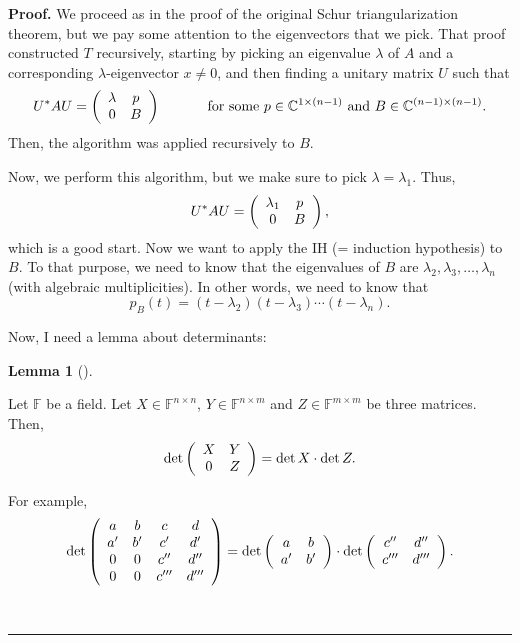 \documentclass[numbers=enddot,12pt,final,onecolumn,notitlepage]{scrartcl}%
\numberwithin{exer}{subsection}
\theoremstyle{definition}
\newtheorem{lem}[theo]{Lemma}
\newenvironment{lemma}[1][]
{\begin{lem}[#1]\begin{leftbar}}
{\end{leftbar}\end{lem}}
\newenvironment{proof}[1][Proof]{\noindent\textbf{#1.} }{\ \rule{0.5em}{0.5em}}
\begin{document}
\begin{proof}
We proceed as in the proof of the original Schur triangularization theorem,
but we pay some attention to the eigenvectors that we pick. That proof
constructed $T$ recursively, starting by picking an eigenvalue $\lambda$ of
$A$ and a corresponding $\lambda$-eigenvector $x\neq0$, and then finding a
unitary matrix $U$ such that%
\[
U^{\ast}AU=\left(
\begin{array}
[c]{cc}%
\lambda & p\\
0 & B
\end{array}
\right)  \ \ \ \ \ \ \ \ \ \ \text{for some }p\in\mathbb{C}^{1\times\left(
n-1\right)  }\text{ and }B\in\mathbb{C}^{\left(  n-1\right)  \times\left(
n-1\right)  }.
\]
Then, the algorithm was applied recursively to $B$.

Now, we perform this algorithm, but we make sure to pick $\lambda=\lambda_{1}%
$. Thus,%
\[
U^{\ast}AU=\left(
\begin{array}
[c]{cc}%
\lambda_{1} & p\\
0 & B
\end{array}
\right)  ,
\]
which is a good start. Now we want to apply the IH (= induction hypothesis) to
$B$. To that purpose, we need to know that the eigenvalues of $B$ are
$\lambda_{2},\lambda_{3},\ldots,\lambda_{n}$ (with algebraic multiplicities).
In other words, we need to know that%
\[
p_{B}\left(  t\right)  =\left(  t-\lambda_{2}\right)  \left(  t-\lambda
_{3}\right)  \cdots\left(  t-\lambda_{n}\right)  .
\]


Now, I need a lemma about determinants:

\begin{lemma}
Let $\mathbb{F}$ be a field. Let $X\in\mathbb{F}^{n\times n}$, $Y\in
\mathbb{F}^{n\times m}$ and $Z\in\mathbb{F}^{m\times m}$ be three matrices.
Then,%
\[
\det\left(
\begin{array}
[c]{cc}%
X & Y\\
0 & Z
\end{array}
\right)  =\det X\cdot\det Z.
\]

\end{lemma}

For example,%
\[
\det\left(
\begin{array}
[c]{cccc}%
a & b & c & d\\
a^{\prime} & b^{\prime} & c^{\prime} & d^{\prime}\\
0 & 0 & c^{\prime\prime} & d^{\prime\prime}\\
0 & 0 & c^{\prime\prime\prime} & d^{\prime\prime\prime}%
\end{array}
\right)  =\det\left(
\begin{array}
[c]{cc}%
a & b\\
a^{\prime} & b^{\prime}%
\end{array}
\right)  \cdot\det\left(
\begin{array}
[c]{cc}%
c^{\prime\prime} & d^{\prime\prime}\\
c^{\prime\prime\prime} & d^{\prime\prime\prime}%
\end{array}
\right)  .
\]



\end{proof}
\end{document}
